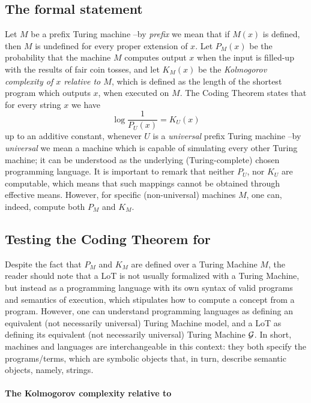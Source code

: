 \subsection{The formal statement}

Let $M$ be a prefix Turing machine --by {\em prefix} we mean that if $M(x)$ is defined, then $M$ is undefined for every proper extension of $x$.
%
Let $P_M(x)$ be the probability that the machine $M$ computes output $x$ when the input is filled-up with the results of fair coin tosses, and let $K_M(x)$ be the {\em Kolmogorov complexity of $x$ relative to $M$}, which is defined as the length of the shortest program which outputs $x$, when executed on $M$. The Coding Theorem states that for every string $x$ we have
%
\begin{equation}
\label{eqF}
\log \frac{1}{P_U(x)} = K_U(x)
\end{equation}
%
up to an additive constant, whenever $U$ is a {\em universal} prefix Turing machine --by {\em universal} we mean a machine which is capable of simulating every other Turing machine; it can be understood as the underlying (Turing-complete) chosen programming language. It is important to remark that neither $P_U$, nor $K_U$ are computable, which means that such mappings cannot be obtained through effective means. However, for specific (non-universal) machines $M$, one can, indeed, compute both $P_M$ and $K_M$.

\subsection{Testing the Coding Theorem for \boldmath{$\geom$}}

Despite the fact that $P_M$ and $K_M$ are defined over a Turing Machine $M$, the reader should note that a LoT is not usually formalized with a Turing Machine, but instead as a programming language with its own syntax of valid programs and semantics of execution, which stipulates how to compute a concept from a program. However, one can understand programming languages as defining an equivalent (not necessarily universal) Turing Machine model, and a LoT as defining its equivalent (not necessarily universal) Turing Machine $\gram$. In short, machines and languages are interchangeable in this context: they both specify the programs/terms, which are symbolic objects that, in turn, describe semantic objects, namely, strings.


\paragraph{The Kolmogorov complexity relative to \boldmath{$\geom$}}


